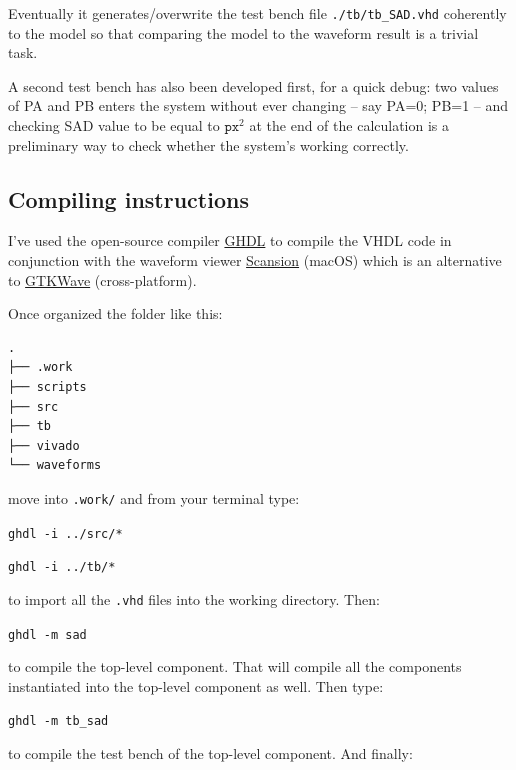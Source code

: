 \documentclass[12pt, a4paper]{article}
\begin{document}
Eventually it generates/overwrite the test bench file \texttt{./tb/tb\_SAD.vhd} coherently to the model so that comparing the model to the waveform result is a trivial task.
\newline

A second test bench has also been developed first, for a quick debug: two values of PA and PB enters the system without ever changing -- say PA=0; PB=1 -- and checking SAD value to be equal to $\texttt{px}^2$ at the end of the calculation is a preliminary way to check whether the system's working correctly.




\subsection{Compiling instructions}

I've used the open-source compiler \href{http://ghdl.free.fr/}{GHDL} to compile the VHDL code in conjunction with the waveform viewer \href{http://www.logicpoet.com/scansion/}{Scansion} (macOS) which is an alternative to \href{http://gtkwave.sourceforge.net/}{GTKWave} (cross-platform).
\newline

Once organized the folder like this:

\begin{verbatim}
.
├── .work
├── scripts
├── src
├── tb
├── vivado
└── waveforms
\end{verbatim}

move into \texttt{.work/} and from your terminal type:
\newline

\texttt{ghdl -i ../src/*}

\texttt{ghdl -i ../tb/*}
\newline

to import all the \texttt{.vhd} files into the working directory. Then:
\newline

\texttt{ghdl -m sad}
\newline

to compile the top-level component. That will compile all the components 
instantiated into the top-level component as well. Then type:
\newline

\texttt{ghdl -m tb\_sad}
\newline

to compile the test bench of the top-level component. And finally:
\newline
\end{document}
